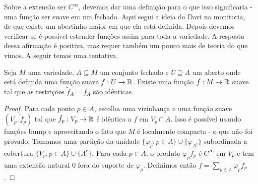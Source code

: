 Sobre a extensão ser $C^\infty$, devemos dar uma definição para o que isso significaria - uma função ser suave em um fechado. Aqui segui a ideia 
do Davi na monitoria, de que existe um abertinho maior em que ela está definida.
Depois devemos verificar se é possível estender funções assim para toda a variedade.
A resposta dessa afirmação é positiva, mas requer também um pouco mais de teoria do que vimos. A seguir temos uma tentativa.

\begin{lemma}
    \label{lemma:extensao_suave}
    Seja $M$ uma variedade, $A \subseteq M$ um conjunto fechado e $U \supseteq A$ um aberto onde está definida uma função 
    suave $f : U \rightarrow \mathbb{R}$. Existe uma função $\tilde{f} : M \rightarrow \mathbb{R}$ suave tal que as restrições $\tilde{f}_{A} = f_A$ são idênticas.
\end{lemma}
\begin{proof}
    Para cada ponto $p \in A$, escolha uma vizinhança e uma função suave $(V_p, \tilde{f}_p)$ tal que $\tilde{f}_p: V_p \rightarrow \mathbb{R}$ é idêntica a $f$ em $V_p \cap A$. 
    Isso é possível usando funções bump e aproveitando o fato que $M$ é localmente compacta - o que não foi provado. 
    Tomamos uma partição da unidade $\{\varphi_p : p \in A\} \cup \{\varphi_{A^c}\}$ subordinada a cobertura $\{V_p : p \in A\} \cup \{A^c\}$. 
    Para cada $p \in A$, o produto $\varphi_p \tilde{f}_p$ é $C^\infty$ em $V_p$ e tem uma extensão natural $0$ fora do 
    suporte de $\varphi_p$. Definimos então $\tilde{f} = \sum_{p\in A} \varphi_p \tilde{f}_p$.
\end{proof}